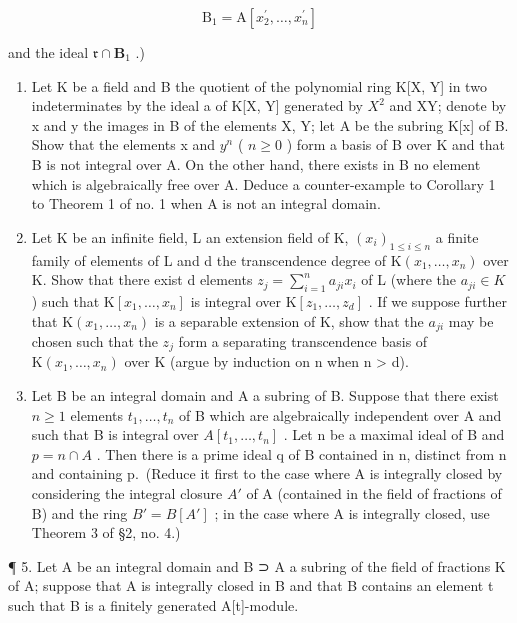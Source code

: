 \[
\mathrm{B} _ {1} = \mathrm{A} [ x _ {2} ^ {\prime}, \dots , x _ {n} ^ {\prime} ]
\]

and the ideal \(\mathfrak{r} \cap \mathbf{B}_1\) .)

\begin{enumerate}
\def\labelenumi{\arabic{enumi}.}
\setcounter{enumi}{1}
\item
  Let K be a field and B the quotient of the polynomial ring K{[}X, Y{]} in two indeterminates by the ideal a of K{[}X, Y{]} generated by \(X^{2}\) and XY; denote by x and y the images in B of the elements X, Y; let A be the subring K{[}x{]} of B. Show that the elements x and \(y^{n}\) ( \(n \geqslant 0\) ) form a basis of B over K and that B is not integral over A. On the other hand, there exists in B no element which is algebraically free over A. Deduce a counter-example to Corollary 1 to Theorem 1 of no. 1 when A is not an integral domain.
\item
  Let K be an infinite field, L an extension field of K, \((x_{i})_{1 \leq i \leq n}\) a finite family of elements of L and d the transcendence degree of \(\mathrm{K}(x_{1}, \ldots, x_{n})\) over K. Show that there exist d elements \(z_{j} = \sum_{i=1}^{n} a_{ji} x_{i}\) of L (where the \(a_{ji} \in K\) ) such that \(\mathrm{K}[x_{1}, \ldots, x_{n}]\) is integral over \(\mathrm{K}[z_{1}, \ldots, z_{d}]\) . If we suppose further that \(\mathrm{K}(x_{1}, \ldots, x_{n})\) is a separable extension of K, show that the \(a_{ji}\) may be chosen such that the \(z_{j}\) form a separating transcendence basis of \(\mathrm{K}(x_{1}, \ldots, x_{n})\) over K (argue by induction on n when n \textgreater{} d).
\item
  Let B be an integral domain and A a subring of B. Suppose that there exist \(n \geqslant 1\) elements \(t_{1}, \ldots, t_{n}\) of B which are algebraically independent over A and such that B is integral over \(A[t_{1}, \ldots, t_{n}]\) . Let n be a maximal ideal of B and \(p = n \cap A\) . Then there is a prime ideal q of B contained in n, distinct from n and containing p.~(Reduce it first to the case where A is integrally closed by considering the integral closure \(A'\) of A (contained in the field of fractions of B) and the ring \(B' = B[A']\) ; in the case where A is integrally closed, use Theorem 3 of §2, no. 4.)
\end{enumerate}

¶ 5. Let A be an integral domain and B ⊃ A a subring of the field of fractions K of A; suppose that A is integrally closed in B and that B contains an element t such that B is a finitely generated A{[}t{]}-module.


